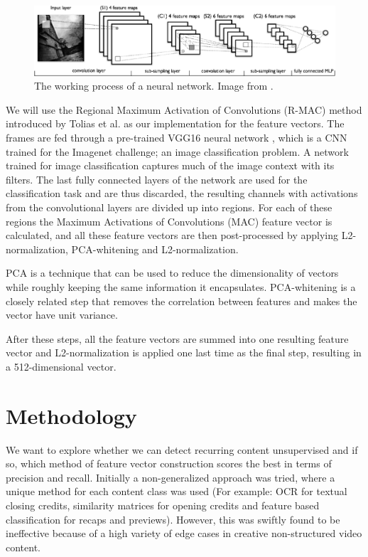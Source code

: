 \documentclass{report}
\begin{document}
\begin{figure}[H]
	\includegraphics[width=\textwidth]{images/convnet.png}
	\centering
	\caption{The working process of a neural network. Image from \cite{convnet-fig}.}
	\label{fig:convnet}
\end{figure}

We will use the Regional Maximum Activation of Convolutions (R-MAC) method introduced by Tolias et al. \cite{tolias2015particular} as our implementation for the feature vectors. The frames are fed through a pre-trained VGG16 neural network \cite{simonyan2014very}, which is a CNN trained for the Imagenet challenge; an image classification problem. A network trained for image classification captures much of the image context with its filters. The last fully connected layers of the network are used for the classification task and are thus discarded, the resulting channels with activations from the convolutional layers are divided up into regions. For each of these regions the Maximum Activations of Convolutions (MAC) feature vector is calculated, and all these feature vectors are then post-processed by applying L2-normalization, PCA-whitening and L2-normalization. 

PCA is a technique that can be used to reduce the dimensionality of vectors while roughly keeping the same information it encapsulates. PCA-whitening is a closely related step that removes the correlation between features and makes the vector have unit variance. 

After these steps, all the feature vectors are summed into one resulting feature vector and L2-normalization is applied one last time as the final step, resulting in a 512-dimensional vector.

\chapter{Methodology} \label{methodology}
We want to explore whether we can detect recurring content unsupervised and if so, which method of feature vector construction scores the best in terms of precision and recall. Initially a non-generalized approach was tried, where a unique method for each content class was used (For example: OCR for textual closing credits, similarity matrices for opening credits and feature based classification for recaps and previews). However, this was swiftly found to be ineffective because of a high variety of edge cases in creative non-structured video content. 
\end{document}
